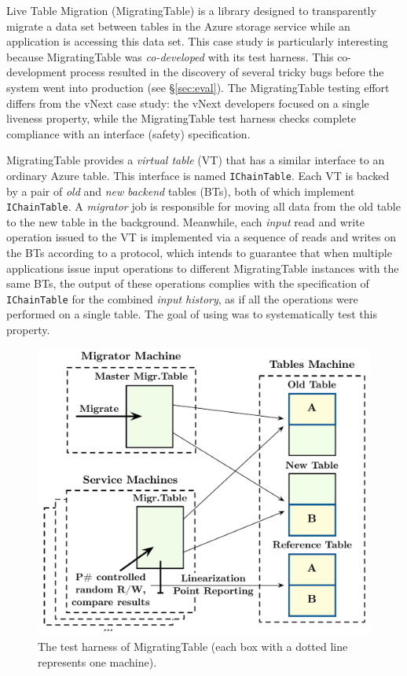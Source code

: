 Live Table Migration (MigratingTable) is a library designed to transparently migrate a data set between tables in the Azure storage service while an application is accessing this data set. This case study is particularly interesting because MigratingTable was \emph{co-developed} with its \psharp test harness. This co-development process resulted in the discovery of several tricky bugs before the system went into production (see \S\ref{sec:eval}). The MigratingTable testing effort differs from the vNext case study: the vNext developers focused on a single liveness property, while the MigratingTable test harness checks complete compliance with an interface (safety) specification.

MigratingTable provides a \emph{virtual table} (VT) that has a similar interface
to an ordinary Azure table. This interface is
named \texttt{IChainTable}. Each VT is backed by a pair
of \emph{old} and \emph{new} \emph{backend} tables (BTs), both of which
implement \texttt{IChainTable}. A \emph{migrator} job is responsible
for moving all data from the old table to the new table in the
background. Meanwhile, each \emph{input} read and write operation
issued to the VT is implemented via a sequence
of reads and writes on the BTs according to a protocol,
which intends to guarantee that when multiple applications issue input
operations to different MigratingTable instances with the same BTs, the output of these operations complies with the specification
of \texttt{IChainTable} for the combined \emph{input history}, as if
all the operations were performed on a single table. The goal of
using \psharp was to systematically test this property.

\begin{figure}[t]
\centering
\includegraphics[width=\linewidth]{img/modeled_migration}
\caption{The \psharp test harness of MigratingTable (each box with a dotted line represents one \psharp machine).}
\label{fig:mockedmigration}
\end{figure}

